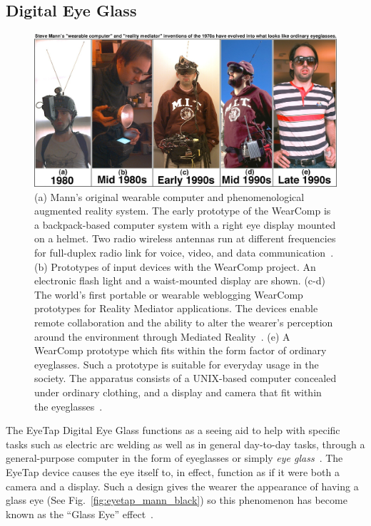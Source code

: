 \subsection{Digital Eye Glass}
\begin{figure}[htb]
\center
 \includegraphics[width=5.5in]{ch1/figures/steve5.jpeg}
 \caption{(a) Mann's original wearable computer and phenomenological augmented reality system. The early prototype 
of the WearComp is a backpack-based computer system with a right eye display mounted on a 
helmet. Two radio wireless antennas run at different frequencies for full-duplex radio link for voice, 
video, and data communication~\cite{mann1994mediated}. (b) Prototypes of input devices with the WearComp 
project. An electronic flash light and a waist-mounted display are shown. (c-d) The world's first portable or 
wearable weblogging WearComp prototypes for Reality Mediator applications. The devices enable 
remote collaboration and the ability to alter the wearer's perception around the environment through 
Mediated Reality~\cite{mann1994mediated}. (e) A WearComp prototype which fits within the form 
factor of ordinary eyeglasses. Such a prototype is suitable for everyday usage in the society. The 
apparatus consists of a UNIX-based computer concealed under ordinary clothing, and a display and 
camera that fit within the eyeglasses~\cite{intelligentimageprocessing}.}
 \label{fig:mannglass}
\end{figure}

The EyeTap Digital Eye Glass functions as a seeing aid to help with specific tasks such as electric arc 
welding as well as in general day-to-day tasks, through a general-purpose computer in the form of 
eyeglasses or simply \emph{eye glass}~\cite{intelligentimageprocessing}. The EyeTap device causes 
the eye itself to, in effect, function as if it were both a camera and a display. Such a design gives the 
wearer the appearance of having a glass eye (See Fig.~\ref{fig:eyetap_mann_black}) so this 
phenomenon has become known as the ``Glass Eye'' effect~\cite{mann260}. 

